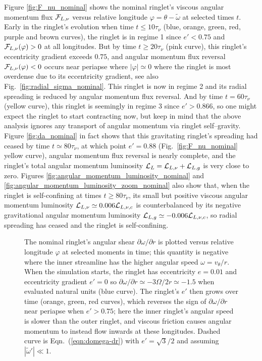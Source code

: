 \documentclass[preprint]{aastex62}
\begin{document}
Figure \ref{fig:F_nu_nominal} shows the nominal ringlet's viscous angular momentum flux
${\cal F}_{L,\nu}$ versus relative longitude $\varphi=\theta-\tilde{\omega}$ at selected times $t$.
Early in the ringlet's evolution when time $t \le 10\tau_\nu$ (blue, orange, green, red, purple 
and brown curves),
the ringlet is in regime 1 since $e'<0.75$ and ${\cal F}_{L,\nu}(\varphi)>0$ at all longitudes.
But by time $t \ge 20\tau_\nu$ (pink curve), this ringlet's eccentricity gradient exceeds $0.75$,
and angular momentum flux reversal ${\cal F}_{L,\nu}(\varphi)<0$ occurs near periapse where $|\varphi|\simeq0$
where the ringlet is most overdense due to its eccentricity gradient, see 
also Fig.\ \ref{fig:radial_sigma_nominal}.
This ringlet is now in regime 2 and its radial spreading is reduced by angular momentum flux reversal. 
And by time $t = 60\tau_\nu$ (yellow curve), this ringlet is seemingly in regime 3
since $e'>0.866$, so one might expect the ringlet to start contracting
now, but keep in mind that the above analysis ignores any transport
of angular momentum via ringlet self--gravity. Figure \ref{fig:da_nominal} in fact
shows that this gravitating ringlet's spreading had ceased by time $t \simeq80\tau_\nu$, 
at which point $e'=0.88$ (Fig.\ \ref{fig:F_nu_nominal} yellow curve), angular momentum flux reversal is nearly complete,
and the ringlet's total angular momentum luminosity ${\cal L}_L={\cal L}_{L,\nu}+{\cal L}_{L,g}$ is very close to zero.
Figures \ref{fig:angular_momentum_luminosity_nominal} and \ref{fig:angular_momentum_luminosity_zoom_nominal} also show that, 
when the ringlet is self-confining at times $t\ge 80\tau_\nu$, 
its small but positive viscous angular momentum luminosity ${\cal L}_{L,\nu}\simeq0.006{\cal L}_{L,\nu,c}$ 
is counterbalanced by its negative gravitational angular momentum luminosity ${\cal L}_{L,g}\simeq -0.006{\cal L}_{L,\nu,c}$,
so radial spreading has ceased and the ringlet is self-confining. 

\begin{figure}
    \caption{
        \label{fig:nominal_shear}
        The nominal ringlet's angular shear $\partial\omega/\partial r$ is plotted versus relative 
        longitude $\varphi$ at selected moments in time; this quantity is negative where the inner streamline
        has the higher angular speed $\omega=v_\theta/r$. When the simulation starts, the
        ringlet has eccentricity $e=0.01$ and eccentricity gradient $e'=0$ 
        so $\partial\omega/\partial r\simeq-3\Omega/2r\simeq-1.5$ when evaluated natural units (blue curve).
        The ringlet's $e'$ then grows over time (orange, green, red curves),
        which reverses the sign of $\partial\omega/\partial r$
        near periapse when $e'>0.75$; here the inner ringlet's angular speed
        is slower than the outer ringlet, and viscous friction causes angular momentum to instead flow inwards
        at these longitudes. Dashed curve is Eqn.\ (\ref{eqn:domega-dr}) with $e'=\sqrt{3}/2$
        and assuming $|\tilde{\omega}'|\ll1$.
    }
\end{figure}
\end{document}
